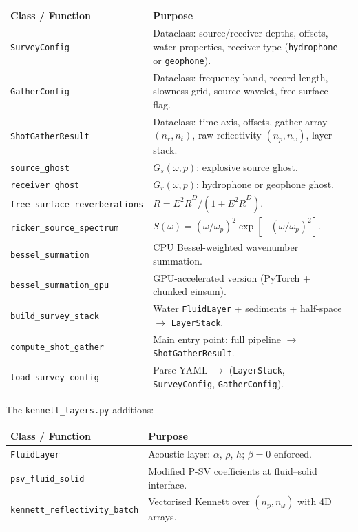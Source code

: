 \documentclass[11pt,a4paper]{article}
\begin{document}
\begin{center}
\renewcommand{\arraystretch}{1.2}
\begin{tabular}{lp{8.5cm}}
\toprule
\textbf{Class / Function} & \textbf{Purpose} \\
\midrule
\texttt{SurveyConfig} &
  Dataclass: source/receiver depths, offsets, water properties,
  receiver type (\texttt{hydrophone} or \texttt{geophone}). \\
\texttt{GatherConfig} &
  Dataclass: frequency band, record length, slowness grid,
  source wavelet, free surface flag. \\
\texttt{ShotGatherResult} &
  Dataclass: time axis, offsets, gather array $(n_r, n_t)$,
  raw reflectivity $(n_p, n_\omega)$, layer stack. \\
\midrule
\texttt{source\_ghost} &
  $G_s(\omega, p)$: explosive source ghost. \\
\texttt{receiver\_ghost} &
  $G_r(\omega, p)$: hydrophone or geophone ghost. \\
\texttt{free\_surface\_reverberations} &
  $R = E^2 \overline{R}^D / (1 + E^2 \overline{R}^D)$. \\
\texttt{ricker\_source\_spectrum} &
  $S(\omega) = (\omega/\omega_p)^2 \exp[-(\omega/\omega_p)^2]$. \\
\texttt{bessel\_summation} &
  CPU Bessel-weighted wavenumber summation. \\
\texttt{bessel\_summation\_gpu} &
  GPU-accelerated version (PyTorch + chunked einsum). \\
\texttt{build\_survey\_stack} &
  Water \texttt{FluidLayer} + sediments + half-space $\to$
  \texttt{LayerStack}. \\
\texttt{compute\_shot\_gather} &
  Main entry point: full pipeline $\to$ \texttt{ShotGatherResult}. \\
\texttt{load\_survey\_config} &
  Parse YAML $\to$ (\texttt{LayerStack}, \texttt{SurveyConfig},
  \texttt{GatherConfig}). \\
\bottomrule
\end{tabular}
\end{center}

\noindent
The \texttt{kennett\_layers.py} additions:

\begin{center}
\renewcommand{\arraystretch}{1.2}
\begin{tabular}{lp{8.5cm}}
\toprule
\textbf{Class / Function} & \textbf{Purpose} \\
\midrule
\texttt{FluidLayer} &
  Acoustic layer: $\alpha$, $\rho$, $h$; $\beta = 0$ enforced. \\
\texttt{psv\_fluid\_solid} &
  Modified P-SV coefficients at fluid--solid interface. \\
\texttt{kennett\_reflectivity\_batch} &
  Vectorised Kennett over $(n_p, n_\omega)$ with 4D arrays. \\
\bottomrule
\end{tabular}
\end{center}
\end{document}
